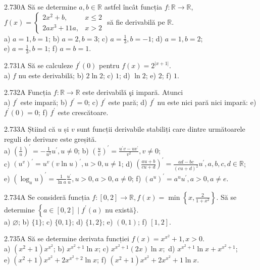 \documentclass[11pt]{article}
\begin{document}
2.730A Să se determine $a, b \in \mathbb{R}$ astfel încât funcția $f: \mathbb{R} \rightarrow \mathbb{R}$,\\ $f(x)=\left\{\begin{array}{ll}2 x^{2}+b, & x \leq 2 \\ 2 a x^{3}+11 a, & x>2\end{array}\right.$ să fie derivabilă pe $\mathbb{R}$.\\ a) $a=1, b=1$; b) $a=2, b=3$; c) $a=\frac{1}{3}, b=-1$; d) $a=1, b=2$;\\ e) $a=\frac{1}{3}, b=1$; f) $a=b=1$.

2.731A Să se calculeze $f^{\prime}(0)$ pentru $f(x)=2^{|x+1|}$.\\ a) $f$ nu este derivabilă; b) $2 \ln 2$; c) $1$; d) $\ln 2$; e) $2$; f) $1$.

2.732A Funcția $f: \mathbb{R} \rightarrow \mathbb{R}$ este derivabilă şi impară. Atunci\\ a) $f^{\prime}$ este impară; b) $f^{\prime}=0$; c) $f^{\prime}$ este pară; d) $f^{\prime}$ nu este nici pară nici impară: e) $f^{\prime}(0)=0$; f) $f^{\prime}$ este crescătoare.

2.733A Știind că $u$ și $v$ sunt funcții derivabile stabiliți care dintre următoarele reguli de derivare este greșită.\\ a) $\left(\frac{1}{u}\right)^{\prime}=-\frac{1}{u^{2}} u^{\prime}, u \neq 0$; b) $\left(\frac{u}{v}\right)^{\prime}=\frac{u^{\prime} v-u v^{\prime}}{v^{2}}, v \neq 0$;\\ c) $\left(u^{v}\right)^{\prime}=u^{v}(v \ln u)^{\prime}, u>0, u \neq 1$; d) $\left(\frac{a u+b}{c u+d}\right)^{\prime}=\frac{a d-b c}{(c u+d)^{2}} u^{\prime}, a, b, c, d \in \mathbb{R}$;\\ e) $\left(\log _{a} u\right)^{\prime}=\frac{1}{\ln a} \frac{u^{\prime}}{u}, u>0, a>0, a \neq 0$; f) $\left(a^{u}\right)^{\prime}=a^{u} u^{\prime}, a>0, a \neq e$.

2.734A Se consideră funcția $f:[0,2] \rightarrow \mathbb{R}, f(x)=\min \left\{x, \frac{2}{1+x^{2}}\right\}$. Să se determine $\left\{a \in[0,2] \mid f^{\prime}(a)\right.$ nu există$\}$.\\ a) $\varnothing$; b) $\{1\}$; c) $\{0,1\}$; d) $\{1,2\}$; e) $(0,1)$; f) $[1,2]$.

2.735A Să se determine derivata funcției $f(x)=x^{x^{2}}+1, x>0$.\\ a) $\left(x^{2}+1\right) x^{x^{2}}$; b) $x^{x^{2}+1} \ln x$; c) $x^{x^{2}+1}(2 x) \ln x ;$ d) $x^{x^{2}+1} \ln x+x^{x^{2}+1}$;\\ e) $\left(x^{2}+1\right) x^{x^{2}}+2 x^{x^{2}+2} \ln x$; f) $\left(x^{2}+1\right) x^{x^{2}}+2 x^{x^{2}}+1 \ln x$.
\end{document}
